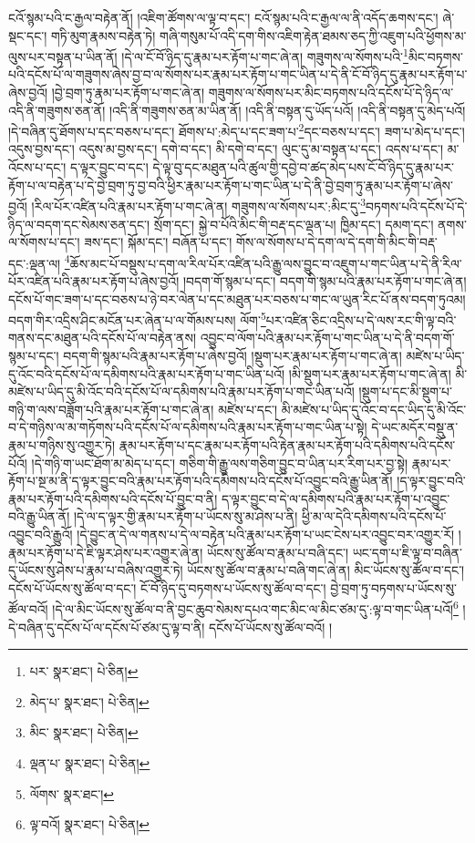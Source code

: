 ངའོ་སྙམ་པའི་ང་རྒྱལ་བརྟེན་ནོ། །འཇིག་ཚོགས་ལ་ལྟ་བ་དང་། ངའོ་སྙམ་པའི་ང་རྒྱལ་ལ་ནི་འདོད་ཆགས་དང་། ཞེ་སྡང་དང་། གཏི་མུག་རྣམས་བརྟེན་ཏེ། གཞི་གསུམ་པོ་འདི་དག་གིས་འཇིག་རྟེན་ཐམས་ཅད་ཀྱི་འཇུག་པའི་ཕྱོགས་མ་ལུས་པར་བསྟན་པ་ཡིན་ནོ། །དེ་ལ་ངོ་བོ་ཉིད་དུ་རྣམ་པར་རྟོག་པ་གང་ཞེ་ན། གཟུགས་ལ་སོགས་པའི་\footnote{པར་  སྣར་ཐང་།  པེ་ཅིན། }མིང་བཏགས་པའི་དངོས་པོ་ལ་གཟུགས་ཞེས་བྱ་བ་ལ་སོགས་པར་རྣམ་པར་རྟོག་པ་གང་ཡིན་པ་དེ་ནི་ངོ་བོ་ཉིད་དུ་རྣམ་པར་རྟོག་པ་ཞེས་བྱའོ། །བྱེ་བྲག་ཏུ་རྣམ་པར་རྟོག་པ་གང་ཞེ་ན། གཟུགས་ལ་སོགས་པར་མིང་བཏགས་པའི་དངོས་པོ་དེ་ཉིད་ལ་འདི་ནི་གཟུགས་ཅན་ནོ། །འདི་ནི་གཟུགས་ཅན་མ་ཡིན་ནོ། །འདི་ནི་བསྟན་དུ་ཡོད་པའོ། །འདི་ནི་བསྟན་དུ་མེད་པའོ། །དེ་བཞིན་དུ་ཐོགས་པ་དང་བཅས་པ་དང་། ཐོགས་པ་:མེད་པ་དང་ཟག་པ་\footnote{མེད་པ་  སྣར་ཐང་།  པེ་ཅིན། }དང་བཅས་པ་དང་། ཟག་པ་མེད་པ་དང་། འདུས་བྱས་དང་། འདུས་མ་བྱས་དང་། དགེ་བ་དང་། མི་དགེ་བ་དང་། ལུང་དུ་མ་བསྟན་པ་དང་། འདས་པ་དང་། མ་འོངས་པ་དང་། ད་ལྟར་བྱུང་བ་དང་། དེ་ལྟ་བུ་དང་མཐུན་པའི་ཚུལ་གྱི་དབྱེ་བ་ཚད་མེད་པས་ངོ་བོ་ཉིད་དུ་རྣམ་པར་རྟོག་པ་ལ་བརྟེན་པ་དེ་བྱེ་བྲག་ཏུ་བྱ་བའི་ཕྱིར་རྣམ་པར་རྟོག་པ་གང་ཡིན་པ་དེ་ནི་བྱེ་བྲག་ཏུ་རྣམ་པར་རྟོག་པ་ཞེས་བྱའོ། །རིལ་པོར་འཛིན་པའི་རྣམ་པར་རྟོག་པ་གང་ཞེ་ན། གཟུགས་ལ་སོགས་པར་:མིང་དུ་\footnote{མིང་  སྣར་ཐང་།  པེ་ཅིན། }བཏགས་པའི་དངོས་པོ་དེ་ཉིད་ལ་བདག་དང་སེམས་ཅན་དང་། སྲོག་དང་། སྐྱེ་བ་པོའི་མིང་གི་བརྡ་དང་ལྡན་པ། ཁྱིམ་དང་། དམག་དང་། ནགས་ལ་སོགས་པ་དང་། ཟས་དང་། སྐོམ་དང་། བཞོན་པ་དང་། གོས་ལ་སོགས་པ་དེ་དག་ལ་དེ་དག་གི་མིང་གི་བརྡ་དང་:ལྡན་ལ། \footnote{ལྡན་པ་  སྣར་ཐང་།  པེ་ཅིན། }ཆོས་མང་པོ་བསྡུས་པ་དག་ལ་རིལ་པོར་འཛིན་པའི་རྒྱུ་ལས་བྱུང་བ་འཇུག་པ་གང་ཡིན་པ་དེ་ནི་རིལ་པོར་འཛིན་པའི་རྣམ་པར་རྟོག་པ་ཞེས་བྱའོ། །བདག་གོ་སྙམ་པ་དང་། བདག་གི་སྙམ་པའི་རྣམ་པར་རྟོག་པ་གང་ཞེ་ན། དངོས་པོ་གང་ཟག་པ་དང་བཅས་པ་ཉེ་བར་ལེན་པ་དང་མཐུན་པར་བཅས་པ་གང་ལ་ཡུན་རིང་པོ་ནས་བདག་ཏུའམ། བདག་གིར་འདྲིས་ཤིང་མངོན་པར་ཞེན་པ་ལ་གོམས་པས། ལོག་\footnote{ལོགས་  སྣར་ཐང་། }པར་འཛིན་ཅིང་འདྲིས་པ་དེ་ལས་རང་གི་ལྟ་བའི་གནས་དང་མཐུན་པའི་དངོས་པོ་ལ་བརྟེན་ནས། འབྱུང་བ་ལོག་པའི་རྣམ་པར་རྟོག་པ་གང་ཡིན་པ་དེ་ནི་བདག་གོ་སྙམ་པ་དང་། བདག་གི་སྙམ་པའི་རྣམ་པར་རྟོག་པ་ཞེས་བྱའོ། །སྡུག་པར་རྣམ་པར་རྟོག་པ་གང་ཞེ་ན། མཛེས་པ་ཡིད་དུ་འོང་བའི་དངོས་པོ་ལ་དམིགས་པའི་རྣམ་པར་རྟོག་པ་གང་ཡིན་པའོ། །མི་སྡུག་པར་རྣམ་པར་རྟོག་པ་གང་ཞེ་ན། མི་མཛེས་པ་ཡིད་དུ་མི་འོང་བའི་དངོས་པོ་ལ་དམིགས་པའི་རྣམ་པར་རྟོག་པ་གང་ཡིན་པའོ། །སྡུག་པ་དང་མི་སྡུག་པ་གཉི་ག་ལས་བཟློག་པའི་རྣམ་པར་རྟོག་པ་གང་ཞེ་ན། མཛེས་པ་དང་། མི་མཛེས་པ་ཡིད་དུ་འོང་བ་དང་ཡིད་དུ་མི་འོང་བ་དེ་གཉིས་ལ་མ་གཏོགས་པའི་དངོས་པོ་ལ་དམིགས་པའི་རྣམ་པར་རྟོག་པ་གང་ཡིན་པ་སྟེ། དེ་ཡང་མདོར་བསྡུ་ན་རྣམ་པ་གཉིས་སུ་འགྱུར་ཏེ། རྣམ་པར་རྟོག་པ་དང་རྣམ་པར་རྟོག་པའི་རྟེན་རྣམ་པར་རྟོག་པའི་དམིགས་པའི་དངོས་པོའོ། །དེ་གཉི་ག་ཡང་ཐོག་མ་མེད་པ་དང་། གཅིག་གི་རྒྱུ་ལས་གཅིག་བྱུང་བ་ཡིན་པར་རིག་པར་བྱ་སྟེ། རྣམ་པར་རྟོག་པ་སྔ་མ་ནི་ད་ལྟར་བྱུང་བའི་རྣམ་པར་རྟོག་པའི་དམིགས་པའི་དངོས་པོ་འབྱུང་བའི་རྒྱུ་ཡིན་ནོ། །ད་ལྟར་བྱུང་བའི་རྣམ་པར་རྟོག་པའི་དམིགས་པའི་དངོས་པོ་བྱུང་བ་ནི། ད་ལྟར་བྱུང་བ་དེ་ལ་དམིགས་པའི་རྣམ་པར་རྟོག་པ་འབྱུང་བའི་རྒྱུ་ཡིན་ནོ། །དེ་ལ་ད་ལྟར་གྱི་རྣམ་པར་རྟོག་པ་ཡོངས་སུ་མ་ཤེས་པ་ནི། ཕྱི་མ་ལ་དེའི་དམིགས་པའི་དངོས་པོ་འབྱུང་བའི་རྒྱུའོ། །དེ་བྱུང་ན་དེ་ལ་གནས་པ་དེ་ལ་བརྟེན་པའི་རྣམ་པར་རྟོག་པ་ཡང་ངེས་པར་འབྱུང་བར་འགྱུར་རོ། །རྣམ་པར་རྟོག་པ་དེ་ཇི་ལྟར་ཤེས་པར་འགྱུར་ཞེ་ན། ཡོངས་སུ་ཚོལ་བ་རྣམ་པ་བཞི་དང་། ཡང་དག་པ་ཇི་ལྟ་བ་བཞིན་དུ་ཡོངས་སུ་ཤེས་པ་རྣམ་པ་བཞིས་འགྱུར་ཏེ། ཡོངས་སུ་ཚོལ་བ་རྣམ་པ་བཞི་གང་ཞེ་ན། མིང་ཡོངས་སུ་ཚོལ་བ་དང་། དངོས་པོ་ཡོངས་སུ་ཚོལ་བ་དང་། ངོ་བོ་ཉིད་དུ་བཏགས་པ་ཡོངས་སུ་ཚོལ་བ་དང་། བྱེ་བྲག་ཏུ་བཏགས་པ་ཡོངས་སུ་ཚོལ་བའོ། །དེ་ལ་མིང་ཡོངས་སུ་ཚོལ་བ་ནི་བྱང་ཆུབ་སེམས་དཔའ་གང་མིང་ལ་མིང་ཙམ་དུ་:ལྟ་བ་གང་ཡིན་པའོ།\footnote{ལྟ་བའོ།  སྣར་ཐང་།  པེ་ཅིན། } །དེ་བཞིན་དུ་དངོས་པོ་ལ་དངོས་པོ་ཙམ་དུ་ལྟ་བ་ནི། དངོས་པོ་ཡོངས་སུ་ཚོལ་བའོ། །
